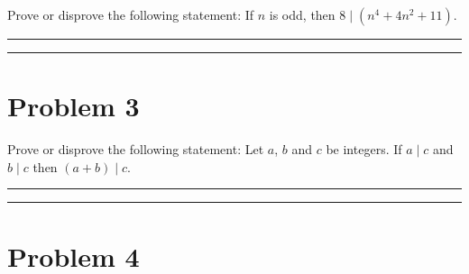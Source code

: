 \documentclass{article}
\theoremstyle{definition}
\newenvironment{solution}{\bigskip\hrule{\hfill}}{\bigskip\hrule{\hfill}} %
\begin{document}
Prove or disprove the following statement: If $n$ is odd, then $8\mid\left(n^4+4n^2+11\right)$.

\begin{solution}


\end{solution}


\newpage


\section*{Problem 3}

Prove or disprove the following statement: Let $a$, $b$ and $c$ be integers. If $a\mid c$ and $b\mid c$ then $\left(a+b\right)\mid c$.


\begin{solution}


\end{solution}


\newpage


\section*{Problem 4}
\end{document}
